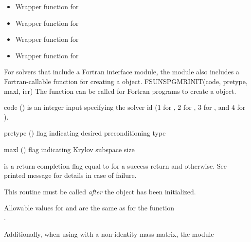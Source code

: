 \begin{itemize}

\item {}

  Wrapper function for 

\item {}

  Wrapper function for 

\item {}

  Wrapper function for 

\item {}

  Wrapper function for 

\end{itemize}
For solvers that include a Fortran interface module, the
{\sunlinsolspgmr} module also includes a Fortran-callable function
for creating a  object.
{
  FSUNSPGMRINIT(code, pretype, maxl, ier)
}
{
  The function  can be called for Fortran programs
  to create a {\sunlinsolspgmr} object.
}
{
  \begin{args}[pretype]
  \item[code] ()
    is an integer input specifying the solver id (1 for {\cvode}, 2
    for {\ida}, 3 for {\kinsol}, and 4 for {\arkode}).
  \item[pretype] ()
    flag indicating desired preconditioning type
  \item[maxl] ()
    flag indicating Krylov subspace size
  \end{args}
}
{
   is a return completion flag equal to  for a success
  return and  otherwise. See printed message for details in case
  of failure.
}
{
  This routine must be called \emph{after} the {\nvector} object has
  been initialized.

  Allowable values for  and  are the same as for
  the {\CC} function \\ \noindent {}. 
}
Additionally, when using
{\arkode} with a non-identity mass matrix, the {\sunlinsolspgmr} module
